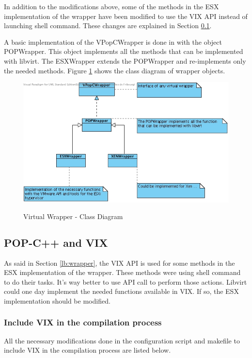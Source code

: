 In addition to the modifications above, some of the methods in the ESX implementation of the wrapper have been modified to use the VIX API instead of launching shell command. These changes are explained in Section \ref{lb:vix}.\s

A basic implementation of the VPopCWrapper is done in with the object POPWrapper. This object implements all the methods that can be implemented with libvirt. The ESXWrapper extends the POPWrapper and re-implements only the needed methods. Figure \ref{fig:wrapper_cd} shows the class diagram of wrapper objects. 

\begin{figure}[ht]
	\caption{Virtual Wrapper - Class Diagram}
  	\centering
	\includegraphics[width=1.0\textwidth]{./pic/wrapper_cd.jpg}
	\label{fig:wrapper_cd}
\end{figure}


%
%

\pagebreak
\subsection{POP-C++ and VIX}
\label{lb:vix}
As said in Section \ref{lb:wrapper}, the VIX API is used for some methods in the ESX implementation of the wrapper. These methods were using shell command to do their tasks. It's way better to use API call to perform those actions. Libvirt could one day implement the needed functions available in VIX. If so, the ESX implementation should be modified. 

\subsubsection{Include VIX in the compilation process}

All the necessary modifications done in the configuration script and makefile to include VIX in the compilation process are listed below.\s

